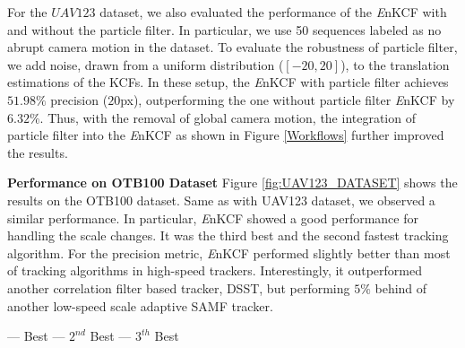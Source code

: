 \documentclass[10pt,twocolumn,letterpaper]{article}
\begin{document}
For the $UAV123$ dataset, we also evaluated the performance of the
{\it E}nKCF with and without the particle filter. In particular, we
use 50 sequences labeled as no abrupt camera motion in the dataset. To
evaluate the robustness of particle filter, we add noise, drawn from a
uniform distribution ($[-20,20]$), to the translation estimations of
the KCFs. In these setup, the {\it E}nKCF with particle filter
achieves $51.98\%$ precision ($20$px), outperforming the one without
particle filter {\it E}nKCF by $6.32\%$. Thus, with the removal of
global camera motion, the integration of particle filter into the {\it
  E}nKCF as shown in Figure \ref{Workflows} further improved the
results.

\textbf{Performance on OTB100 Dataset} Figure \ref{fig:UAV123_DATASET}
shows the results on the OTB100 dataset. Same as with UAV123 dataset,
we observed a similar performance. In particular, {\it E}nKCF showed a
good performance for handling the scale changes. It was the third best
and the second fastest tracking algorithm. For the precision metric,
{\it E}nKCF performed slightly better than most of tracking algorithms
in high-speed trackers. Interestingly, it outperformed another
correlation filter based tracker, DSST, but performing $5\%$ behind of
another low-speed scale adaptive SAMF tracker.

\begin{table}[h]
\smaller
\begin{center}
\color{green}--- Best \hspace{.15\linewidth}\color{red}--- $2^{nd}$ Best \hspace{.15\linewidth}\color{blue}--- $3^{th}$ Best \color{black}\\
\end{center}
\caption{Results of running different combinations of the KCFs for
  UAV123 dataset. This table empirically supported the usefulness of
  combining multiple KCFs as long as the deployment order is optimal.}
\label{table:Comparison_to_LCT}
\end{table}
\end{document}
